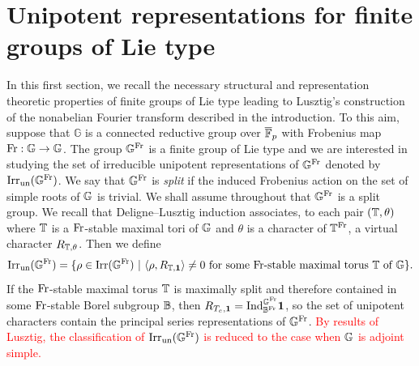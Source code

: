 \section{Unipotent representations for finite groups of Lie type}\label{sec:finite_groups}

In this first section, we recall the necessary structural and representation theoretic properties of finite groups of Lie type leading to Lusztig's construction of the nonabelian Fourier transform described in the introduction. To this aim, suppose that $\mathbb{G}$ is a connected reductive group over $\overline{\mathbb{F}}_p$ with Frobenius map $\mathrm{Fr}:\mathbb{G}\rightarrow\mathbb{G}$. The group $\mathbb{G}^{\mathrm{Fr}}$ is a finite group of Lie type and we are interested in studying the set of irreducible unipotent representations of $\mathbb{G}^{\mathrm{Fr}}$ denoted by $\mathrm{Irr}_{\mathrm{un}}(\mathbb{G}^{\mathrm{Fr}})$. We say that $\mathbb{G}^{\mathrm{Fr}}$ is \textit{split} if the induced Frobenius action on the set of simple roots of $\mathbb{G}$ is trivial. We shall assume throughout that $\mathbb{G}^{\mathrm{Fr}}$ is a split group. We recall that Deligne--Lusztig induction associates, to each pair $(\mathbb{T},\theta)$ where $\mathbb{T}$ is a $\mathrm{Fr}$-stable maximal tori of $\mathbb{G}$ and $\theta$ is a character of $\mathbb{T}^{\mathrm{Fr}}$, a virtual character $R_{\mathbb{T},\theta}$. Then we define 
$$\Irr_{\un}(\GFr)=\{\rho\in\Irr(\GFr)\ |\ \langle\rho,R_{\TT,\mathbf{1}}\rangle\neq0\text{ for some $\Fr$-stable maximal torus $\TT$ of $\GG$}\}.$$
If the $\mathrm{Fr}$-stable maximal torus $\mathbb{T}$ is maximally split and therefore contained in some $\mathrm{Fr}$-stable Borel subgroup $\mathbb{B}$, then $R_{T_e,\mathbf{1}}=\mathrm{Ind}_{\mathbb{B}^{\mathrm{Fr}}}^{\mathbb{G}^{\mathrm{Fr}}}\mathbf{1}$, so the set of unipotent characters contain the principal series representations of $\mathbb{G}^{\mathrm{Fr}}$. \textcolor{red}{By results of Lusztig, the classification of $\mathrm{Irr}_{\mathrm{un}}(\mathbb{G}^{\mathrm{Fr}})$ is reduced to the case when $\mathbb{G}$ is adjoint simple.}

